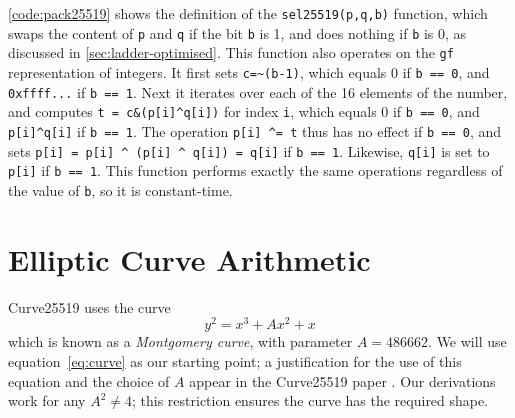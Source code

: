 \documentclass{article}
\begin{document}
\autoref{code:pack25519} shows the definition of the \verb|sel25519(p,q,b)| function, which swaps the content of \verb|p| and \verb|q| if the bit \verb|b| is 1, and does nothing if \verb|b| is 0, as discussed in \autoref{sec:ladder-optimised}.
This function also operates on the \verb|gf| representation of integers.
It first sets \verb|c=~(b-1)|, which equals 0 if \verb|b == 0|, and \verb|0xffff...| if \verb|b == 1|.
Next it iterates over each of the 16 elements of the number, and computes \verb|t = c&(p[i]^q[i])| for index \verb|i|, which equals 0 if \verb|b == 0|, and \verb|p[i]^q[i]| if \verb|b == 1|.
The operation \verb|p[i] ^= t| thus has no effect if \verb|b == 0|, and sets \verb|p[i] = p[i] ^ (p[i] ^ q[i]) = q[i]| if \verb|b == 1|.
Likewise, \verb|q[i]| is set to \verb|p[i]| if \verb|b == 1|.
This function performs exactly the same operations regardless of the value of \verb|b|, so it is constant-time.

\section{Elliptic Curve Arithmetic}\label{sec:curve-arithmetic}

Curve25519 uses the curve
\begin{equation}\label{eq:curve}
y^2 = x^3 + A x^2 + x
\end{equation}
which is known as a \emph{Montgomery curve}, with parameter $A = 486662$.
We will use equation~\eqref{eq:curve} as our starting point; a justification for the use of this equation and the choice of $A$ appear in the Curve25519 paper \cite{Bernstein:2006kw}.
Our derivations work for any $A^2 \ne 4$; this restriction ensures the curve has the required shape.
\end{document}
